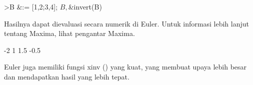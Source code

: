 \documentclass[12pt,Times new roman,letterpaper]{book}
\begin{document}
\begin{eulernootebook}
\begin{eulercomment}
\begin{eulercomment}
\begin{eulernootebook}
\begin{eulercomment}
\begin{eulercomment}
\begin{eulercomment}
\begin{eulercomment}
\begin{eulercomment}
\begin{eulercomment}
\begin{eulerttcomment}
\end{eulerttcomment}
\begin{eulerprompt}
>B &:= [1,2;3,4]; $B, $&invert(B)
\end{eulerprompt}
\begin{eulercomment}
Hasilnya dapat dievaluasi secara numerik di Euler. Untuk informasi
lebih lanjut tentang Maxima, lihat pengantar Maxima.
\end{eulercomment}
\begin{euleroutput}
             -2             1 
            1.5          -0.5 
\end{euleroutput}
\begin{eulercomment}
Euler juga memiliki fungsi xinv () yang kuat, yang membuat upaya lebih
besar dan mendapatkan hasil yang lebih tepat.


\end{eulercomment}
\end{eulercomment}
\end{eulercomment}
\end{eulercomment}
\end{eulercomment}
\end{eulercomment}
\end{eulercomment}
\end{eulernootebook}
\end{eulercomment}
\end{eulercomment}
\end{eulernootebook}
\end{document}
